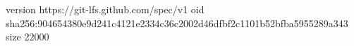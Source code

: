version https://git-lfs.github.com/spec/v1
oid sha256:904654380e9d241c4121e2334c36c2002d46dfbf2c1101b52bfba5955289a343
size 22000
